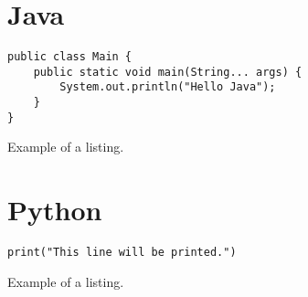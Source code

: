 
\lipsum[1]

\section{Java}

\lipsum[1]

\begin{listing}[H]
\begin{verbatim}
public class Main {
    public static void main(String... args) {
        System.out.println("Hello Java");
    }
}
\end{verbatim}
\caption{Example of a listing.}
\label{lst:java}
\end{listing}

\section{Python}

\lipsum[1]

\begin{listing}[H]
\begin{verbatim}
print("This line will be printed.")
\end{verbatim}
\caption{Example of a listing.}
\label{lst:python}
\end{listing}

\lipsum[1]
